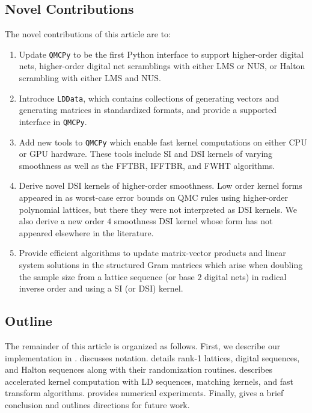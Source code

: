 \documentclass[acmsmall]{acmart}
\begin{document}
\subsection{Novel Contributions}

The novel contributions of this article are to: 
\begin{enumerate}
    \item Update \texttt{QMCPy} to be the first Python interface to support higher-order digital nets, higher-order digital net scramblings with either LMS or NUS, or Halton scrambling with either LMS and NUS.
    \item Introduce \texttt{LDData}, which contains collections of generating vectors and generating matrices in standardized formats, and provide a supported interface in \texttt{QMCPy}.
    \item Add new tools to \texttt{QMCPy} which enable fast kernel computations on either CPU or GPU hardware. These tools include SI and DSI kernels of varying smoothness as well as the FFTBR, IFFTBR, and FWHT algorithms. 
    \item Derive novel DSI kernels of higher-order smoothness. Low order kernel forms appeared in \citep{baldeaux.polylat_efficient_comp_worse_case_error_cbc} as worst-case error bounds on QMC rules using higher-order polynomial lattices, but there they were not interpreted as DSI kernels. We also derive a new  order $4$ smoothness DSI kernel whose form has not appeared elsewhere in the literature.
    \item Provide efficient algorithms to update matrix-vector products and linear system solutions in the structured Gram matrices which arise when doubling the sample size from a lattice sequence (or base $2$ digital nets) in radical inverse order and using a SI (or DSI) kernel.
\end{enumerate}

\subsection{Outline} 


The remainder of this article is organized as follows. First, we describe our implementation in .  discusses notation.  details rank-1 lattices, digital sequences, and Halton sequences along with their randomization routines.  describes accelerated kernel computation with LD sequences, matching kernels, and fast transform algorithms.  provides numerical experiments. Finally,  gives a brief conclusion and outlines directions for future work. 
\end{document}
